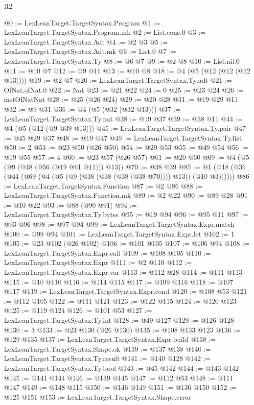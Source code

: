 \begin{lexlean}{R2}
\begin{coremodule}
@0 := LexLeanTarget.TargetSyntax.Program
@1 := LexLeanTarget.TargetSyntax.Program.mk
@2 := List.cons.{0}
@3 := LexLeanTarget.TargetSyntax.Adt
@4 := @2 @3
@5 := LexLeanTarget.TargetSyntax.Adt.mk
@6 := List.{0}
@7 := LexLeanTarget.TargetSyntax.Ty
@8 := @6 @7
@9 := @2 @8
@10 := List.nil.{0}
@11 := @10 @7
@12 := @9 @11
@13 := @10 @8
@18 := @4 (@5 (@12 (@12 (@12 @13))))
@19 := @2 @7
@20 := LexLeanTarget.TargetSyntax.Ty.adt
@21 := OfNat.ofNat.{0}
@22 := Nat
@23 := @21 @22
@24 := 0
@25 := @23 @24
@26 := instOfNatNat
@28 := @25 (@26 @24)
@29 := @20 @28
@31 := @19 @29 @11
@32 := @9 @31
@36 := @4 (@5 (@32 (@32 @13)))
@37 := LexLeanTarget.TargetSyntax.Ty.nat
@38 := @19 @37
@39 := @38 @11
@44 := @4 (@5 (@12 (@9 @39 @13)))
@45 := LexLeanTarget.TargetSyntax.Ty.pair
@47 := @45 @29 @37
@48 := @19 @47
@49 := LexLeanTarget.TargetSyntax.Ty.list
@50 := 2
@53 := @23 @50 (@26 @50)
@54 := @20 @53
@55 := @49 @54
@56 := @19 @55
@57 := 4
@60 := @23 @57 (@26 @57)
@61 := @20 @60
@69 := @4 (@5 (@9 (@48 (@56 (@19 @61 @11))) @13))
@70 := @38 @39
@85 := @1 (@18 (@36 (@44 (@69 (@4 (@5 (@9 (@38 (@38 (@38 (@38 @70)))) @13)) (@10 @3))))))
@86 := LexLeanTarget.TargetSyntax.Function
@87 := @2 @86
@88 := LexLeanTarget.TargetSyntax.Function.mk
@89 := @2 @22
@90 := @89 @28
@91 := @10 @22
@93 := @88 (@90 @91)
@94 := LexLeanTarget.TargetSyntax.Ty.bytes
@95 := @19 @94
@96 := @95 @11
@97 := @93 @96
@98 := @97 @94
@99 := LexLeanTarget.TargetSyntax.Expr.match
@100 := @99 @94
@101 := LexLeanTarget.TargetSyntax.Expr.let
@102 := 1
@105 := @23 @102 (@26 @102)
@106 := @101 @105
@107 := @106 @94
@108 := LexLeanTarget.TargetSyntax.Expr.call
@109 := @108 @105
@110 := LexLeanTarget.TargetSyntax.Expr
@111 := @2 @110
@112 := LexLeanTarget.TargetSyntax.Expr.var
@113 := @112 @28
@114 := @111 @113
@115 := @10 @110
@116 := @114 @115
@117 := @109 @116
@118 := @107 @117
@119 := LexLeanTarget.TargetSyntax.Expr.cond
@120 := @108 @53
@121 := @112 @105
@122 := @111 @121
@123 := @122 @115
@124 := @120 @123
@125 := @119 @124
@126 := @101 @53
@127 := LexLeanTarget.TargetSyntax.Ty.int
@128 := @49 @127
@129 := @126 @128
@130 := 3
@133 := @23 @130 (@26 @130)
@135 := @108 @133 @123
@136 := @129 @135
@137 := LexLeanTarget.TargetSyntax.Expr.build
@138 := LexLeanTarget.TargetSyntax.Shape.ok
@139 := @137 @138
@140 := LexLeanTarget.TargetSyntax.Ty.result
@141 := @140 @128
@142 := LexLeanTarget.TargetSyntax.Ty.bool
@143 := @45 @142
@144 := @143 @142
@145 := @141 @144
@146 := @139 @145
@147 := @112 @53
@148 := @111 @147
@149 := @148 @115
@150 := @146 @149
@151 := @136 @150
@152 := @125 @151
@153 := LexLeanTarget.TargetSyntax.Shape.error

\end{coremodule}
\end{lexlean}

